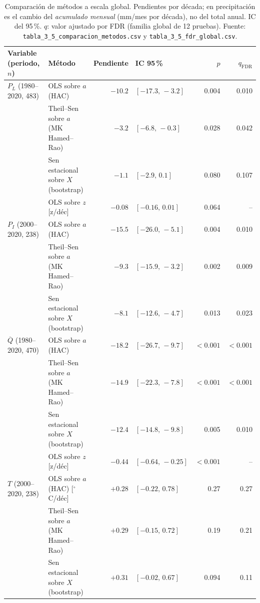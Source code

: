 \documentclass[11pt,letterpaper]{article}
\begin{document}
\begin{table}[H]
\centering\footnotesize
\caption{Comparación de métodos a escala global. Pendientes por década; en precipitación es el cambio del
\emph{acumulado mensual} (mm/mes por década), no del total anual. IC del 95\,\%. $q$: valor ajustado por FDR
(familia global de 12 pruebas). Fuente: \texttt{tabla\_3\_5\_comparacion\_metodos.csv} y \texttt{tabla\_3\_5\_fdr\_global.csv}.}
\label{tab:metodos}
\begin{tabular}{llrlrr}
\toprule
Variable (periodo, $n$) & Método & Pendiente & IC 95\,\% & $p$ & $q_{\mathrm{FDR}}$ \\
\midrule
$P_L$ (1980--2020, 483) & OLS sobre $a$ (HAC) & $-10.2$ & $[-17.3,\,-3.2]$ & 0.004 & 0.010 \\
 & Theil--Sen sobre $a$ (MK Hamed--Rao) & $-3.2$ & $[-6.8,\,-0.3]$ & 0.028 & 0.042 \\
 & Sen estacional sobre $X$ (bootstrap) & $-1.1$ & $[-2.9,\,0.1]$ & 0.080 & 0.107 \\
 & OLS sobre $z$ [z/déc] & $-0.08$ & $[-0.16,\,0.01]$ & 0.064 & -- \\
\midrule
$P_I$ (2000--2020, 238) & OLS sobre $a$ (HAC) & $-15.5$ & $[-26.0,\,-5.1]$ & 0.004 & 0.010 \\
 & Theil--Sen sobre $a$ (MK Hamed--Rao) & $-9.3$ & $[-15.9,\,-3.2]$ & 0.002 & 0.009 \\
 & Sen estacional sobre $X$ (bootstrap) & $-8.1$ & $[-12.6,\,-4.7]$ & 0.013 & 0.023 \\
\midrule
$\overline{Q}$ (1980--2020, 470) & OLS sobre $a$ (HAC) & $-18.2$ & $[-26.7,\,-9.7]$ & $<0.001$ & $<0.001$ \\
 & Theil--Sen sobre $a$ (MK Hamed--Rao) & $-14.9$ & $[-22.3,\,-7.8]$ & $<0.001$ & $<0.001$ \\
 & Sen estacional sobre $X$ (bootstrap) & $-12.4$ & $[-14.8,\,-9.8]$ & 0.005 & 0.010 \\
 & OLS sobre $z$ [z/déc] & $-0.44$ & $[-0.64,\,-0.25]$ & $<0.001$ & -- \\
\midrule
$T$ (2000--2020, 238) & OLS sobre $a$ (HAC) [$^\circ$C/déc] & $+0.28$ & $[-0.22,\,0.78]$ & 0.27 & 0.27 \\
 & Theil--Sen sobre $a$ (MK Hamed--Rao) & $+0.29$ & $[-0.15,\,0.72]$ & 0.19 & 0.21 \\
 & Sen estacional sobre $X$ (bootstrap) & $+0.31$ & $[-0.02,\,0.67]$ & 0.094 & 0.11 \\
\bottomrule
\end{tabular}
\end{table}
\end{document}
